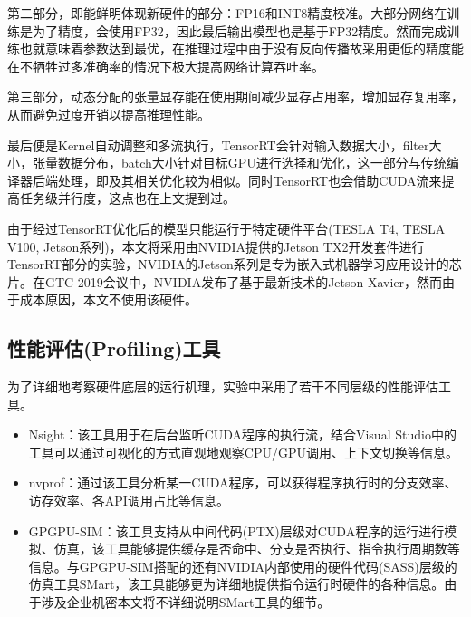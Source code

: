 \par 第二部分，即能鲜明体现新硬件的部分：FP16和INT8精度校准。大部分网络在训练是为了精度，会使用FP32，因此最后输出模型也是基于FP32精度。然而完成训练也就意味着参数达到最优，在推理过程中由于没有反向传播故采用更低的精度能在不牺牲过多准确率的情况下极大提高网络计算吞吐率。
\par 第三部分，动态分配的张量显存能在使用期间减少显存占用率，增加显存复用率，从而避免过度开销以提高推理性能。
\par 最后便是Kernel自动调整和多流执行，TensorRT会针对输入数据大小，filter大小，张量数据分布，batch大小针对目标GPU进行选择和优化，这一部分与传统编译器后端处理，即及其相关优化较为相似。同时TensorRT也会借助CUDA流来提高任务级并行度，这点也在上文提到过。
\par 由于经过TensorRT优化后的模型只能运行于特定硬件平台(TESLA T4, TESLA V100, Jetson系列)\cite{TENSORRTDOC}，本文将采用由NVIDIA提供的Jetson TX2开发套件进行TensorRT部分的实验，NVIDIA的Jetson系列是专为嵌入式机器学习应用设计的芯片。在GTC 2019会议中，NVIDIA发布了基于最新技术的Jetson Xavier，然而由于成本原因，本文不使用该硬件。

\subsection{性能评估(Profiling)工具}
\par 为了详细地考察硬件底层的运行机理，实验中采用了若干不同层级的性能评估工具。
\begin{itemize}
	\item Nsight：该工具用于在后台监听CUDA程序的执行流，结合Visual Studio中的工具可以通过可视化的方式直观地观察CPU/GPU调用、上下文切换等信息\cite{NSIGHT}。
	\item nvprof：通过该工具分析某一CUDA程序，可以获得程序执行时的分支效率、访存效率、各API调用占比等信息\cite{NVPROF}。
	\item GPGPU-SIM：该工具支持从中间代码(PTX)层级对CUDA程序的运行进行模拟、仿真，该工具能够提供缓存是否命中、分支是否执行、指令执行周期数等信息\cite{GPGPUSIM}。与GPGPU-SIM搭配的还有NVIDIA内部使用的硬件代码(SASS)层级的仿真工具SMart，该工具能够更为详细地提供指令运行时硬件的各种信息。由于涉及企业机密本文将不详细说明SMart工具的细节。
\end{itemize}
